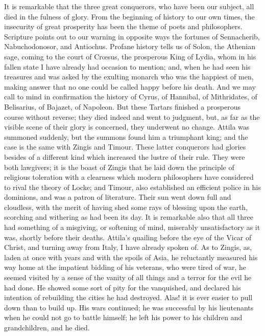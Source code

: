 It is remarkable that the
three great conquerors, who have been our subject, all died in the
fulness of glory. From the beginning of history to our own times, the
insecurity of great prosperity has been the theme of poets and
philosophers. Scripture points out to our warning in opposite ways the
fortunes of Sennacherib, Nabuchodonosor, and Antiochus. Profane
history tells us of Solon, the Athenian sage, coming to the court of
Crœsus, the prosperous King of Lydia, whom in his fallen state I have
already had occasion to mention; and, when he had seen his treasures
and was asked by the exulting monarch who was the happiest of men,
making answer that no one could be called happy before his death. And we may call to mind in confirmation the history of Cyrus, of
Hannibal, of Mithridates, of Belisarius, of Bajazet, of Napoleon. But
these Tartars finished a prosperous course without reverse; they died
indeed and went to judgment, but, as far as the visible scene of their
glory is concerned, they underwent no change. Attila was summoned
suddenly, but the summons found him a triumphant king; and the case is
the same with Zingis and Timour. These latter conquerors had glories
besides of a different kind which increased the lustre of their rule.
They were both lawgivers; it is the boast of Zingis that he laid down
the principle of religious toleration with a clearness which modern philosophers
have considered to rival the theory of Locke; and Timour,
also established an efficient police in his dominions, and was a
patron of literature. Their sun went down full and cloudless, with the
merit of having shed some rays of blessing upon the earth, scorching
and withering as had been its day. It is remarkable also that all
three had something of a misgiving, or softening of mind, miserably
unsatisfactory as it was, shortly before their deaths. Attila's
quailing before the eye of the Vicar of Christ, and turning away from
Italy, I have already spoken of. As to Zingis, as, laden at once with
years and with the spoils of Asia, he reluctantly measured his way
home at the impatient bidding of his veterans, who were tired of war,
he seemed visited by a sense of the vanity of all things and a terror
for the evil he had done. He showed some sort of pity for the
vanquished, and declared his intention of rebuilding the cities he had
destroyed. Alas! it is ever easier to pull down than to build up. His
wars continued; he was successful by his lieutenants when he could not
go to battle himself; he left his power to his children and
grandchildren, and he died.

